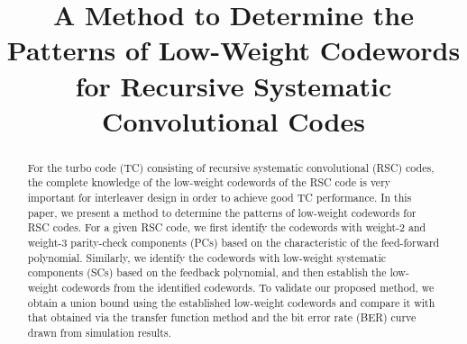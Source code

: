 \documentclass[conference,letterpaper,10pt,top=0.7in]{IEEEtran}
\newcommand{\folder}{/home/bohulu/Documents/texmf}
\begin{document}
\title{
A Method to Determine the Patterns of Low-Weight Codewords for Recursive Systematic Convolutional Codes}
\author{%
}


\maketitle
\begin{abstract}
For the turbo code (TC) consisting of  recursive systematic convolutional (RSC) codes, the complete knowledge of the low-weight codewords of the RSC code is very important for interleaver design in order to achieve good TC performance. In this paper, we present a method to determine the patterns of low-weight codewords for  RSC codes. For a given RSC code, we first identify the codewords with weight-$2$ and weight-$3$ parity-check components (PCs) based on the characteristic of the feed-forward polynomial. Similarly, we identify the codewords with low-weight systematic components (SCs) based on the feedback polynomial, and then establish the low-weight codewords from the identified codewords. To validate our proposed method, we obtain a union bound using the established low-weight codewords and compare it with that obtained via the transfer function method and the bit error rate (BER) curve drawn from simulation results.
\end{abstract}







\end{document}
